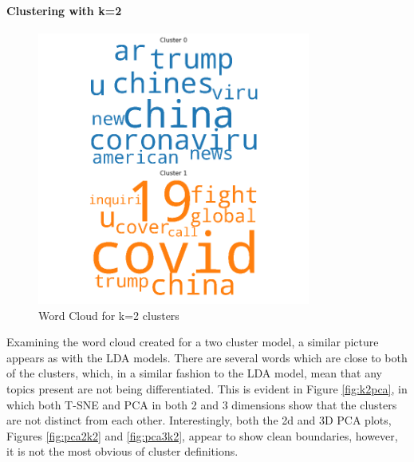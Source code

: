 \paragraph{Clustering with k=2}
\begin{figure}[H]
	\centering
	\includegraphics[width=0.8\textwidth]{images/kmeans_word_cloud_k=2.png}
	\caption{Word Cloud for k=2 clusters}
	\label{fig:wck2}
\end{figure}
Examining the word cloud created for a two cluster model, a similar picture appears as with the LDA models. There are several words which are close to both of the clusters, which, in a similar fashion to the LDA model, mean that any topics present are not being differentiated. This is evident in Figure \ref{fig:k2pca}, in which both T-SNE and PCA in both 2 and 3 dimensions show that the clusters are not distinct from each other. Interestingly, both the 2d and 3D PCA plots, Figures \ref{fig:pca2k2} and \ref{fig:pca3k2}, appear to show clean boundaries, however, it is not the most obvious of cluster definitions.

